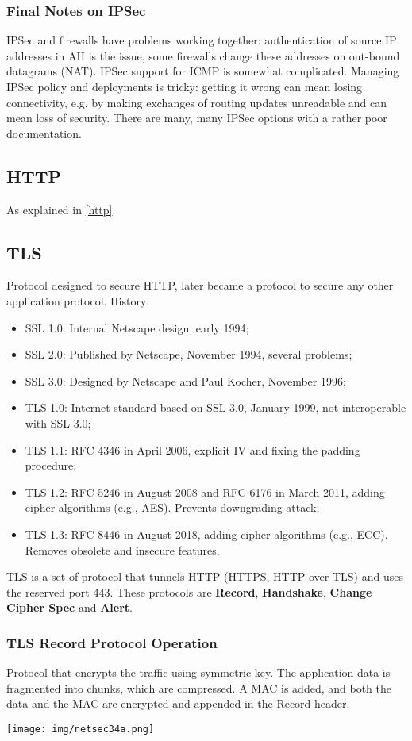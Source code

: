\documentclass[a4paper, 10pt, titlepage]{article}
\begin{document}
\subsubsection*{Final Notes on IPSec}
IPSec and firewalls have problems working together: authentication of source IP addresses in AH is the issue, some firewalls change these addresses on out-bound datagrams (NAT). IPSec support for ICMP is somewhat complicated. Managing IPSec policy and deployments is tricky: getting it wrong can mean losing connectivity, e.g. by making exchanges of routing updates unreadable and can mean loss of security. There are many, many IPSec options with a rather poor documentation.

\subsection*{HTTP}
As explained in \ref{http}.
\subsection{TLS}
Protocol designed to secure HTTP, later became a protocol to secure any other application protocol. History:
\begin{itemize}
	\item SSL 1.0: Internal Netscape design, early 1994;
	\item SSL 2.0: Published by Netscape, November 1994, several problems;
	\item SSL 3.0: Designed by Netscape and Paul Kocher, November 1996;
	\item TLS 1.0: Internet standard based on SSL 3.0, January 1999, not interoperable with SSL 3.0;
	\item TLS 1.1: RFC 4346 in April 2006, explicit IV and fixing the padding procedure;
	\item TLS 1.2: RFC 5246 in August 2008 and RFC 6176 in March 2011, adding cipher algorithms (e.g., AES). Prevents downgrading attack;
	\item TLS 1.3: RFC 8446 in August 2018, adding cipher algorithms (e.g., ECC). Removes obsolete and insecure features.
\end{itemize}
TLS is a set of protocol that tunnels HTTP (HTTPS, HTTP over TLS) and uses the reserved port 443. These protocols are \textbf{Record}, \textbf{Handshake}, \textbf{Change Cipher Spec} and \textbf{Alert}.

\subsubsection*{TLS Record Protocol Operation}
Protocol that encrypts the traffic using symmetric key. The application data is fragmented into chunks, which are compressed. A MAC is added, and both the data and the MAC are encrypted and appended in the Record header.
\begin{center}
	\texttt{[image: img/netsec34a.png]}
\end{center}
\end{document}
